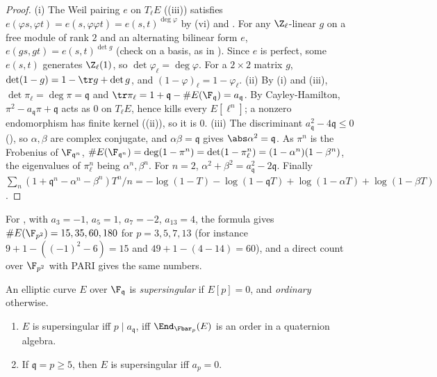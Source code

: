 \begin{proof}
(i) The Weil pairing $e$ on $T_\ell E$ ((iii)) satisfies $e(\varphi s,\varphi t)=e(s,\hat\varphi\varphi t)=e(s,t)^{\deg\varphi}$ by (vi) and
. For any $\Z_\ell$-linear $g$ on a free module of rank $2$ and an alternating bilinear form $e$, $e(gs,gt)=e(s,t)^{\det g}$ (check on a basis, as in
). Since $e$ is perfect, some $e(s,t)$ generates $\Z_\ell(1)$, so $\det\varphi_\ell=\deg\varphi$. For a $2\times2$ matrix $g$, $\det(1-g)=1-\tr g+\det g$, and $(1-\varphi)_\ell=1-\varphi_\ell$.
(ii) By (i) and (iii), $\det\pi_\ell=\deg\pi=\mathfrak q$ and $\tr\pi_\ell=1+\mathfrak q-\#E(\F_{\mathfrak q})=a_{\mathfrak q}$. By Cayley-Hamilton, $\pi^2-a_{\mathfrak q}\pi+\mathfrak q$ acts as $0$ on
$T_\ell E$, hence kills every $E[\ell^n]$; a nonzero endomorphism has finite kernel ((ii)), so it is $0$.
(iii) The discriminant $a_{\mathfrak q}^2-4\mathfrak q\le0$ (), so $\alpha,\beta$ are complex conjugate, and $\alpha\beta=\mathfrak q$ gives $\abs\alpha^2=\mathfrak q$. As $\pi^n$ is the Frobenius
of $\F_{\mathfrak q^n}$, $\#E(\F_{\mathfrak q^n})=\deg(1-\pi^n)=\det(1-\pi_\ell^n)=(1-\alpha^n)(1-\beta^n)$, the eigenvalues of $\pi_\ell^n$ being $\alpha^n,\beta^n$. For $n=2$, $\alpha^2+\beta^2=a_{\mathfrak q}^2-2\mathfrak q$. Finally
$\sum_n(1+\mathfrak q^n-\alpha^n-\beta^n)T^n/n=-\log(1-T)-\log(1-\mathfrak qT)+\log(1-\alpha T)+\log(1-\beta T)$.
\end{proof}

\noindent For , with $a_3=-1$, $a_5=1$, $a_7=-2$, $a_{13}=4$, the formula gives $\#E(\F_{p^2})=15,35,60,180$ for $p=3,5,7,13$ (for instance $9+1-((-1)^2-6)=15$ and $49+1-(4-14)=60$), and a direct count over $\F_{p^2}$ with PARI
gives the same numbers.

\begin{definition}\label{def:ellcurves:supersingular}
An elliptic curve $E$ over $\F_{\mathfrak q}$ is \emph{supersingular} if $E[p]=0$, and \emph{ordinary} otherwise.
\end{definition}

\begin{proposition}\label{prop:ellcurves:supersingular}
\leavevmode
\begin{enumerate}[label=(\roman*)]
\item $E$ is supersingular iff $p\mid a_{\mathfrak q}$, iff $\End_{\Fbar_p}(E)$ is an order in a quaternion algebra.
\item If $\mathfrak q=p\ge5$, then $E$ is supersingular iff $a_p=0$.
\end{enumerate}
\end{proposition}

